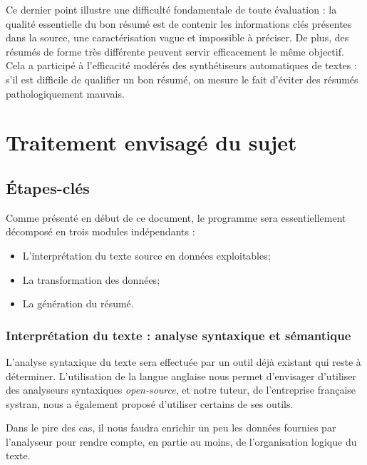 \documentclass{article}           %
\begin{document}
  Ce dernier point illustre une difficulté fondamentale de toute évaluation : la qualité essentielle du bon résumé est de contenir les informations clés présentes dans la source, une caractérisation vague et impossible à préciser. De plus, des résumés de forme très différente peuvent servir efficacement le même objectif. Cela a participé à l'efficacité modérés des synthétiseurs automatiques de textes : s'il est difficile de qualifier un bon résumé, on mesure le fait d'éviter des résumés pathologiquement mauvais.

\section{Traitement envisagé du sujet}

\subsection{Étapes-clés} %

Comme présenté en début de ce document, le programme sera essentiellement décomposé en trois modules indépendants :
\begin{itemize}
 \item L'interprétation du texte source en données exploitables;
 \item La transformation des données;
 \item La génération du résumé.
\end{itemize}


\subsubsection{Interprétation du texte : analyse syntaxique et sémantique}

L'analyse syntaxique du texte sera effectuée par un outil déjà existant qui reste à déterminer. L'utilisation de la langue anglaise nous permet d'envisager d'utiliser des analyseurs syntaxiques \emph{open-source}, et notre tuteur, de l'entreprise française systran, nous a également proposé d'utiliser certains de ses outils.

Dans le pire des cas, il nous faudra enrichir un peu les données fournies par l'analyseur pour rendre compte, en partie au moins, de l'organisation logique du texte.

\end{document}
